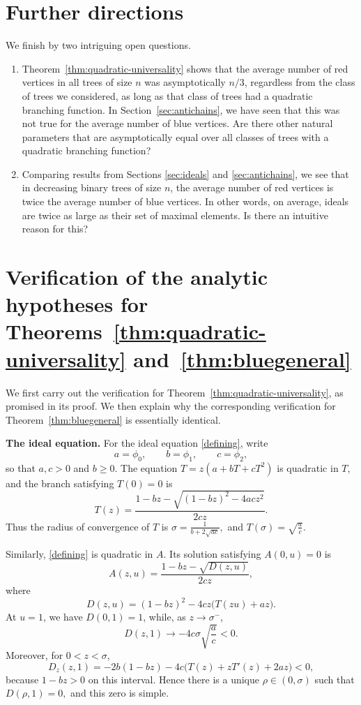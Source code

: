 \documentclass[10pt,a4paper]{amsart}
\theoremstyle{remark}
\begin{document}
\section{Further directions}
We finish by two intriguing open questions. 
\begin{enumerate}
\item Theorem~\ref{thm:quadratic-universality} shows that the average number of red vertices
in all trees of size $n$ was asymptotically $n/3$, regardless from the class of trees we considered, 
as long as that class of trees had a quadratic branching function. In Section~\ref{sec:antichains}, we have seen that this was not true for the average number of blue vertices. Are there other natural parameters that are 
asymptotically equal over all classes of trees with a quadratic branching function?
\item Comparing results from Sections \ref{sec:ideals} and \ref{sec:antichains}, we see that in decreasing binary trees of size $n$, the average number
of red vertices is twice the average number of blue vertices. In other words, on average, ideals are twice as large as their set of maximal elements. Is there an intuitive reason for this? 
\end{enumerate}

\appendix
\section{Verification of the analytic hypotheses for Theorems~\ref{thm:quadratic-universality} and~\ref{thm:bluegeneral}}
\label{app:analytic-verification}

We first carry out the verification for
Theorem~\ref{thm:quadratic-universality}, as promised in its proof.  We then
explain why the corresponding verification for
Theorem~\ref{thm:bluegeneral} is essentially identical.

\medskip
\noindent\textbf{The ideal equation.}
For the ideal
equation \eqref{defining}, write
\[
a=\phi_0,\qquad b=\phi_1,\qquad c=\phi_2,
\]
so that $a,c>0$ and $b\geq 0$.  The equation
$
T=z(a+bT+cT^2)
$
is quadratic in $T$, and the branch satisfying $T(0)=0$ is
\[
T(z)=\frac{1-bz-\sqrt{(1-bz)^2-4ac z^2}}{2cz}.
\]
Thus the radius of convergence of $T$ is
$
\sigma=\frac{1}{b+2\sqrt{ac}},
$
and
$
T(\sigma)=\sqrt{\frac{a}{c}}.
$

Similarly, \eqref{defining} is quadratic in $A$.  Its solution satisfying
$A(0,u)=0$ is
\[
A(z,u)=\frac{1-bz-\sqrt{D(z,u)}}{2cz},
\]
where
\[
D(z,u)=(1-bz)^2-4cz\bigl(T(zu)+az\bigr).
\]
At $u=1$, we have $D(0,1)=1$, while, as $z\to\sigma^-$,
\[
D(z,1)\longrightarrow -4c\sigma\sqrt{\frac{a}{c}}<0.
\]
Moreover, for $0<z<\sigma$,
\[
D_z(z,1)
=-2b(1-bz)-4c\bigl(T(z)+zT'(z)+2az\bigr)<0,
\]
because $1-bz>0$ on this interval.  Hence there is a unique
$\rho\in(0,\sigma)$ such that
$
D(\rho,1)=0,
$
and this zero is simple.
\end{document}
